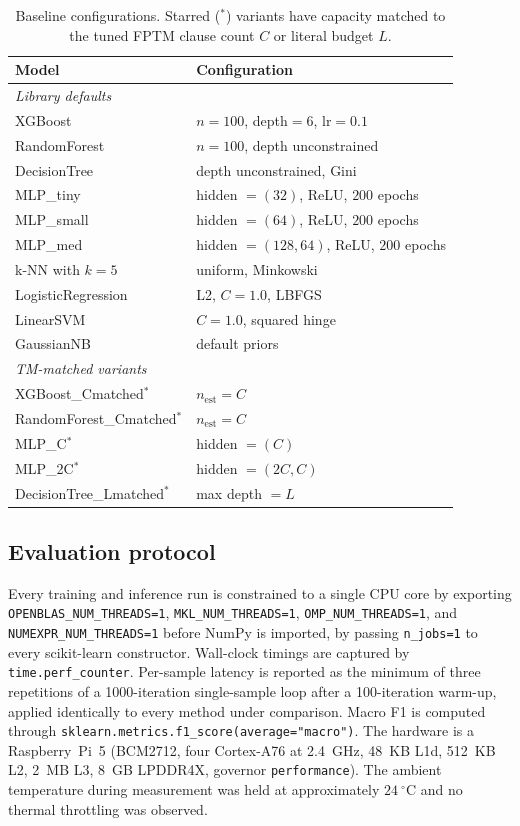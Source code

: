 \documentclass[journal,10pt]{IEEEtran}
\begin{document}
\begin{table}[t]
\centering
\caption{Baseline configurations. Starred ($^\ast$) variants have
         capacity matched to the tuned FPTM clause count $C$ or
         literal budget $L$.}
\label{tab:model_configs}
\begin{tabular}{ll}
\toprule
Model & Configuration \\
\midrule
\multicolumn{2}{l}{\textit{Library defaults}} \\
\midrule
XGBoost              & $n{=}100$, depth${=}6$, lr${=}0.1$ \\
RandomForest         & $n{=}100$, depth unconstrained \\
DecisionTree         & depth unconstrained, Gini \\
MLP\_tiny            & hidden $=(32)$, ReLU, $200$ epochs \\
MLP\_small           & hidden $=(64)$, ReLU, $200$ epochs \\
MLP\_med             & hidden $=(128,64)$, ReLU, $200$ epochs \\
k-NN with $k=5$      & uniform, Minkowski \\
LogisticRegression   & L2, $C{=}1.0$, LBFGS \\
LinearSVM            & $C{=}1.0$, squared hinge \\
GaussianNB           & default priors \\
\midrule
\multicolumn{2}{l}{\textit{TM-matched variants}} \\
\midrule
XGBoost\_Cmatched$^\ast$      & $n_\text{est} = C$ \\
RandomForest\_Cmatched$^\ast$ & $n_\text{est} = C$ \\
MLP\_C$^\ast$                 & hidden $= (C)$ \\
MLP\_2C$^\ast$                & hidden $= (2C, C)$ \\
DecisionTree\_Lmatched$^\ast$ & max depth $= L$ \\
\bottomrule
\end{tabular}
\end{table}

\subsection{Evaluation protocol}
\label{sec:protocol}
Every training and inference run is constrained to a single CPU core
by exporting \texttt{OPENBLAS\_NUM\_THREADS=1},
\texttt{MKL\_NUM\_THREADS=1}, \texttt{OMP\_NUM\_THREADS=1}, and
\texttt{NUMEXPR\_NUM\_THREADS=1} before NumPy is imported, by
passing \texttt{n\_jobs=1} to every scikit-learn
constructor. Wall-clock timings are captured by
\texttt{time.perf\_counter}. Per-sample latency is reported as the
minimum of three repetitions of a 1000-iteration single-sample loop
after a 100-iteration warm-up, applied identically to every method
under comparison. Macro F1 is computed through
\texttt{sklearn.metrics.f1\_score(average="macro")}. The hardware is a
Raspberry~Pi~5 (BCM2712, four Cortex-A76 at 2.4~GHz, 48~KB L1d,
512~KB L2, 2~MB L3, 8~GB LPDDR4X, governor \texttt{performance}).
The ambient temperature during measurement was held at approximately
$24~^\circ$C and no thermal throttling was observed.
\end{document}
